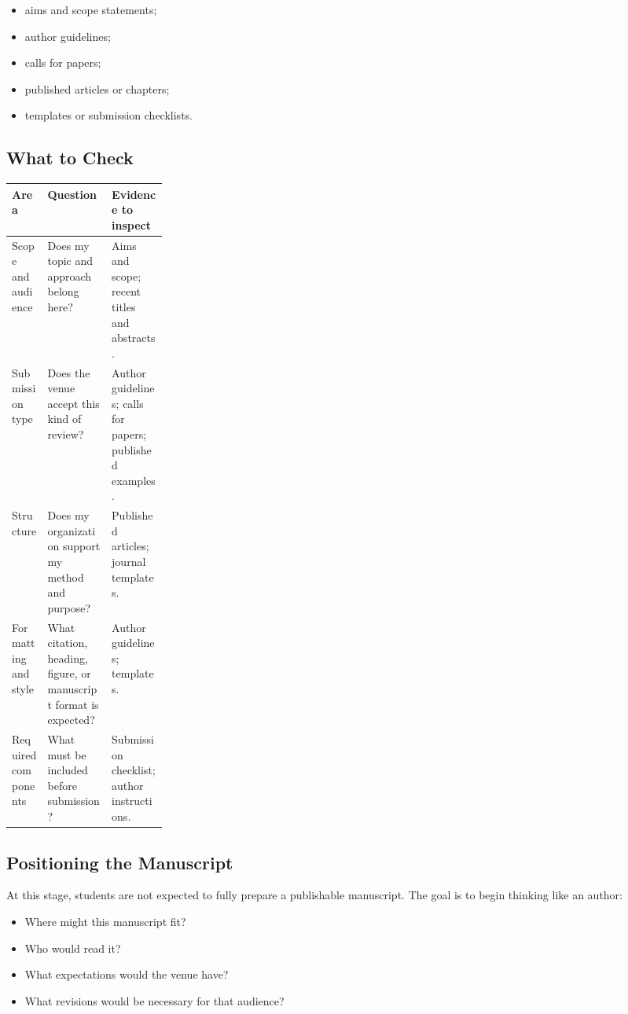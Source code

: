 \documentclass[11pt]{article}
\begin{document}
\begin{itemize}
  \item aims and scope statements;
  \item author guidelines;
  \item calls for papers;
  \item published articles or chapters;
  \item templates or submission checklists.
\end{itemize}

\subsection{What to Check}

\begin{center}
\begin{tabularx}{0.98\linewidth}{>{\raggedright\arraybackslash}p{0.23\linewidth}Y Y}
\toprule
\textbf{Area} & \textbf{Question} & \textbf{Evidence to inspect} \\
\midrule
Scope and audience & Does my topic and approach belong here? & Aims and scope; recent titles and abstracts. \\
Submission type & Does the venue accept this kind of review? & Author guidelines; calls for papers; published examples. \\
Structure & Does my organization support my method and purpose? & Published articles; journal templates. \\
Formatting and style & What citation, heading, figure, or manuscript format is expected? & Author guidelines; templates. \\
Required components & What must be included before submission? & Submission checklist; author instructions. \\
\bottomrule
\end{tabularx}
\end{center}

\subsection{Positioning the Manuscript}

At this stage, students are not expected to fully prepare a publishable manuscript. The goal is to begin thinking like an author:

\begin{itemize}
  \item Where might this manuscript fit?
  \item Who would read it?
  \item What expectations would the venue have?
  \item What revisions would be necessary for that audience?
\end{itemize}
\end{document}
